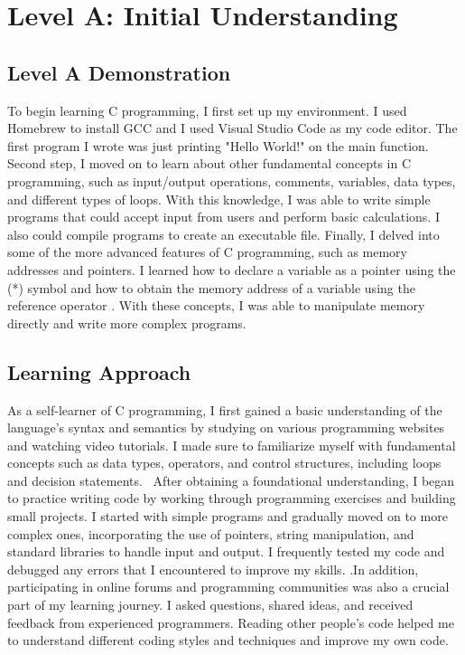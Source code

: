 \documentclass[a4paper, 11pt]{report}
\begin{document}

\tableofcontents





\newpage
\section{Level A: Initial Understanding}
\vspace{5mm}
\subsection{Level A Demonstration}
To begin learning C programming, I first set up my environment. I used Homebrew to install GCC and I used Visual Studio Code as my code editor. The first program I wrote was just printing "Hello World!" on the main function.
Second step, I moved on to learn about other fundamental concepts in C programming, such as input/output operations, comments, variables, data types, and different types of loops. With this knowledge, I was able to write simple programs that could accept input from users and perform basic calculations. I also could compile programs to create an executable file.
Finally, I delved into some of the more advanced features of C programming, such as memory addresses and pointers. I learned how to declare a variable as a pointer using the (*) symbol and how to obtain the memory address of a variable using the reference operator . With these concepts, I was able to manipulate memory directly and write more complex programs.

\subsection{Learning Approach}
As a self-learner of C programming, I first gained a basic understanding of the language's syntax and semantics by studying on various programming websites and watching video tutorials. I made sure to familiarize myself with fundamental concepts such as data types, operators, and control structures, including loops and decision statements.
 After obtaining a foundational understanding, I began to practice writing code by working through programming exercises and building small projects. I started with simple programs and gradually moved on to more complex ones, incorporating the use of pointers, string manipulation, and standard libraries to handle input and output. I frequently tested my code and debugged any errors that I encountered to improve my skills.
.In addition, participating in online forums and programming communities was also a crucial part of my learning journey. I asked questions, shared ideas, and received feedback from experienced programmers. Reading other people's code helped me to understand different coding styles and techniques and improve my own code.
\end{document}
